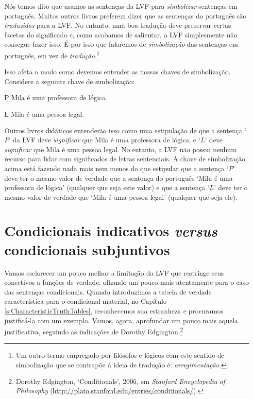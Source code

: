 Nós temos dito que usamos as sentenças da LVF para \emph{simbolizar} sentenças em português.
Muitos outros livros preferem dizer que as sentenças do português são \emph{traduzidas} para a LVF.
No entanto, uma boa tradução deve preservar certas facetas do significado e, como acabamos de salientar, a LVF simplesmente não consegue fazer isso.
É por isso que falaremos de \emph{simbolização} das sentenças em português, em vez de \emph{tradução}.\footnote{
Um outro termo empregado por filósofos e lógicos com este sentido de simbolização que se contrapõe à ideia de tradução é: \emph{arregimentação}.}

Isso afeta o modo como devemos entender as nossas chaves de simbolização.
Considere a seguinte chave de simbolização:
	\begin{ekey}
		\item[P] Mila é uma professora de lógica.
		\item[L] Mila é uma pessoa legal.
	\end{ekey}
Outros livros didáticos entenderão isso como uma estipulação de que a sentença `$P$' da LVF deve \emph{significar} que Mila é uma professora de lógica, e `$L$' deve \emph{significar} que Mila é uma pessoa legal.
No entanto, a LVF não possui nenhum recurso para lidar com significados de letras sentenciais.
A chave de simbolização acima está fazendo nada mais nem menos do que estipular que a sentença `$P$' deve ter o mesmo valor de verdade que a sentença do português `Mila é uma professora de lógica' (qualquer que seja este valor) e que a sentença `$L$' deve ter o mesmo valor de verdade que `Mila é uma pessoa legal' (qualquer que seja ele).

\section[Indicativo \emph{versus} subjuntivo]{Condicionais indicativos \emph{versus} condicionais subjuntivos}\label{s:IndicativeSubjunctive}
Vamos esclarecer um pouco melhor a limitação da LVF que restringe seus conectivos a funções de verdade, olhando um pouco mais atentamente para o caso das sentenças condicionais.
Quando introduzimos a tabela de verdade característica para o condicional material, no Capítulo \ref{s:CharacteristicTruthTables}, reconhecemos sua estranheza e procuramos justificá-la com um exemplo.
Vamos, agora, aprofundar um pouco mais aquela justificativa, seguindo as indicações de Dorothy Edgington.\footnote{Dorothy Edgington, `Conditionals', 2006, em \emph{Stanford Encyclopedia of Philosophy} (\url{http://plato.stanford.edu/entries/conditionals/}).} 

